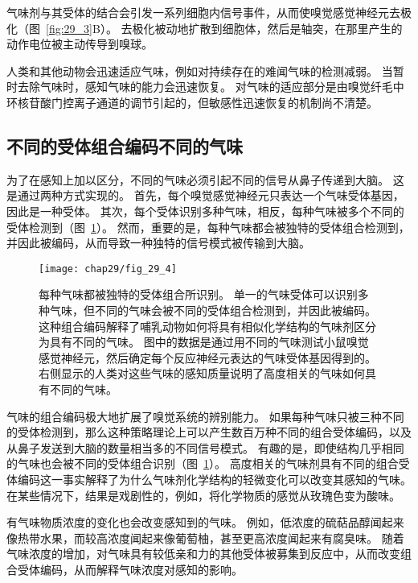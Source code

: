 气味剂与其受体的结合会引发一系列细胞内信号事件，从而使嗅觉感觉神经元去极化（图~\ref{fig:29_3}B）。
去极化被动地扩散到细胞体，然后是轴突，在那里产生的动作电位被主动传导到嗅球。


人类和其他动物会迅速适应气味，例如对持续存在的难闻气味的检测减弱。
当暂时去除气味时，感知气味的能力会迅速恢复。
对气味的适应部分是由嗅觉纤毛中环核苷酸门控离子通道的调节引起的，但敏感性迅速恢复的机制尚不清楚。



\subsection{不同的受体组合编码不同的气味}

为了在感知上加以区分，不同的气味必须引起不同的信号从鼻子传递到大脑。
这是通过两种方式实现的。
首先，每个嗅觉感觉神经元只表达一个气味受体基因，因此是一种受体。 
其次，每个受体识别多种气味，相反，每种气味被多个不同的受体检测到（图~\ref{fig:29_4}）。 
然而，重要的是，每种气味都会被独特的受体组合检测到，并因此被编码，从而导致一种独特的信号模式被传输到大脑。


\begin{figure}[htbp]
	\centering
	\texttt{[image: chap29/fig\_29\_4]}
	\caption{每种气味都被独特的受体组合所识别。
		单一的气味受体可以识别多种气味，但不同的气味会被不同的受体组合检测到，并因此被编码。
		这种组合编码解释了哺乳动物如何将具有相似化学结构的气味剂区分为具有不同的气味。
		图中的数据是通过用不同的气味测试小鼠嗅觉感觉神经元，然后确定每个反应神经元表达的气味受体基因得到的。
		右侧显示的人类对这些气味的感知质量说明了高度相关的气味如何具有不同的气味\cite{malnic1999combinatorial}。}
	\label{fig:29_4}
\end{figure}


气味的组合编码极大地扩展了嗅觉系统的辨别能力。
如果每种气味只被三种不同的受体检测到，那么这种策略理论上可以产生数百万种不同的组合受体编码，以及从鼻子发送到大脑的数量相当多的不同信号模式。
有趣的是，即使结构几乎相同的气味也会被不同的受体组合识别（图~\ref{fig:29_4}）。
高度相关的气味剂具有不同的组合受体编码这一事实解释了为什么气味剂化学结构的轻微变化可以改变其感知的气味。
在某些情况下，结果是戏剧性的，例如，将化学物质的感觉从玫瑰色变为酸味。


有气味物质浓度的变化也会改变感知到的气味。
例如，低浓度的硫萜品醇闻起来像热带水果，而较高浓度闻起来像葡萄柚，甚至更高浓度闻起来有腐臭味。
随着气味浓度的增加，对气味具有较低亲和力的其他受体被募集到反应中，从而改变组合受体编码，从而解释气味浓度对感知的影响。



